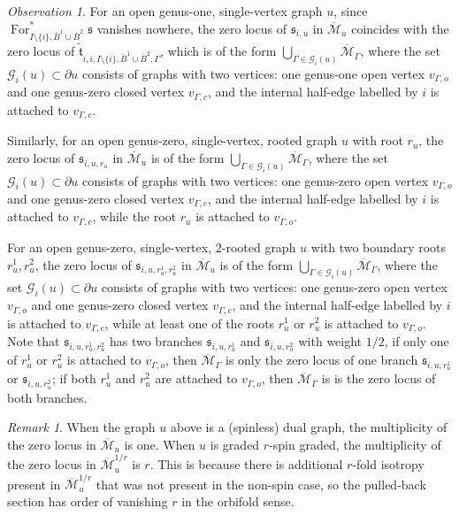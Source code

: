 \documentclass[11pt]{amsart}
\theoremstyle{definition}
\theoremstyle{remark}
\newtheorem{rmk}[dummy]{Remark}
\newtheorem{obs}[dummy]{Observation}
\newcommand{\For}{\operatorname{For}}
\newcommand{\<}{\left<}
\renewcommand{\>}{\right>}
\numberwithin{equation}{section}
\def\Mbar{{\overline{\mathcal M}}}
\begin{document}
\begin{obs}\label{obs vanishing loci of single trr}
    For an open genus-one, single-vertex graph $u$, since $\For_{I\setminus\{i\},\bar B^1 \cup\bar B^2}^*\mathfrak s$ vanishes nowhere, the zero locus of $\mathfrak s_{i,u}$ in $\Mbar_u$ coincides with the zero locus of $\tilde{\mathfrak t}_{i,i,I\setminus\{i\},\bar B^1 \cup\bar B^2,\Gamma}$, which is of the form $\bigcup_{\Gamma\in \mathcal G_i(u)}\Mbar_\Gamma$, where the set $\mathcal G_i(u)\subset \partial u$ consists of graphs with two vertices: one genus-one open vertex $v_{\Gamma,o}$ and one genus-zero closed vertex $v_{\Gamma,c}$, and the internal half-edge labelled by $i$ is attached to $v_{\Gamma,c}$.

    
    Similarly, for an open genus-zero, single-vertex, rooted graph $u$ with  root $r_u$,  the zero locus of $\mathfrak s_{i,u,r_u}$  in $\Mbar_u$ is of the form $\bigcup_{\Gamma\in \mathcal G_i(u)}\Mbar_\Gamma$, where the set $\mathcal G_i(u)\subset \partial u$ consists of graphs with two vertices: one genus-zero open vertex $v_{\Gamma,o}$ and one genus-zero closed vertex $v_{\Gamma,c}$, and the  internal half-edge labelled by $i$ is attached to $v_{\Gamma,c}$, while the root $r_u$ is attached to $v_{\Gamma,o}$. 
    
    For an open genus-zero, single-vertex, 2-rooted graph $u$ with two boundary roots $r_u^1, r_u^2$, the zero locus of $\mathfrak s_{i,u,r_u^1,r_u^2}$ in $\Mbar_u$ is of the form $\bigcup_{\Gamma\in \mathcal G_i(u)}\Mbar_\Gamma$, where the set $\mathcal G_i(u)\subset \partial u$ consists of graphs with two vertices: one genus-zero open vertex $v_{\Gamma,o}$ and one genus-zero closed vertex $v_{\Gamma,c}$, and the  internal half-edge labelled by $i$ is attached to $v_{\Gamma,c}$, while at least one of the roots $r_u^1$ or $r_u^2$ is attached to $v_{\Gamma,o}$. Note that $\mathfrak s_{i,u,r_u^1,r_u^2}$ has two branches $\mathfrak s_{i,u,r_u^1}$ and $\mathfrak s_{i,u,r_u^2}$ with weight $1/2$, if only one of $r_u^1$ or $r_u^2$ is attached to $v_{\Gamma,o}$, then $\Mbar_\Gamma$ is only the zero locus of one branch $\mathfrak s_{i,u,r_u^1}$ or $\mathfrak s_{i,u,r_u^2}$; if both $r_u^1$ and $r_u^2$ are attached to $v_{\Gamma,o}$, then $\Mbar_\Gamma$ is is the zero locus of both branches.

    \begin{rmk}\label{rmk on vanishing order r}
    When the graph $u$ above is a (spinless) dual graph, the multiplicity of the zero locus in $\Mbar_u$ is one.  When $u$ is graded $r$-spin graded, the multiplicity of the zero locus in $\Mbar^{1/r}_u$ is $r$. This is because there is additional $r$-fold isotropy present in $\Mbar^{1/r}_u$ that was not present in the non-spin case, so the pulled-back section has order of vanishing $r$ in the orbifold sense.
    \end{rmk}

    
    
   
\end{obs}
\end{document}
